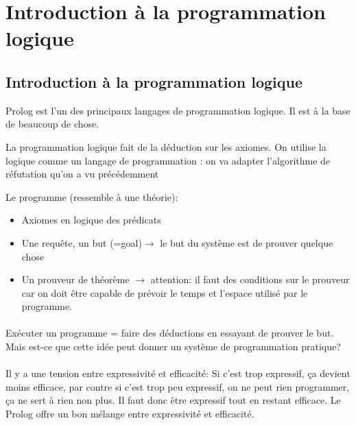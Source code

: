 \section{Introduction à la programmation logique}
\label{p2}
\subsection{Introduction à la programmation logique}

Prolog est l’un des principaux langages de programmation logique. Il est à la base de beaucoup de chose. 

La programmation logique fait de la déduction sur les axiomes.
On utilise la logique comme un langage de programmation : on va adapter l’algorithme de réfutation qu’on a vu précédemment

Le programme (ressemble à une théorie):
\begin{itemize}
	\item Axiomes en logique des prédicats
	\item Une requête, un but (=goal)$\rightarrow$ le but du système est de prouver quelque chose
	\item Un prouveur de théorème $\rightarrow$ attention: il faut des conditions sur le prouveur car on doit être capable de prévoir le temps et l’espace utilisé par le programme.
\end{itemize}

\paragraph{}
Exécuter un programme = faire des déductions en essayant de prouver le but. Mais est-ce que cette idée peut donner un système de programmation pratique?

\paragraph{}
Il y a une tension entre expressivité et efficacité: Si c’est trop expressif, ça devient moins efficace, par contre si c’est trop peu expressif, on ne peut rien programmer, ça ne sert à rien non plus. Il faut donc être expressif tout en restant efficace. Le Prolog offre un bon mélange entre expressivité et efficacité.

